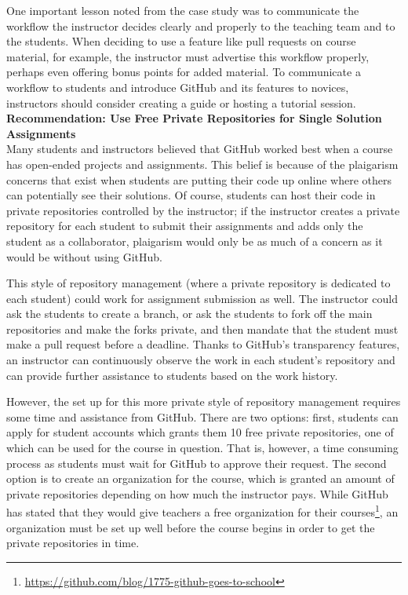 One important lesson noted from the case study was to communicate the workflow the instructor decides clearly and properly to the teaching team and to the students. When deciding to use a feature like pull requests on course material, for example, the instructor must advertise this workflow properly, perhaps even offering bonus points for added material. To communicate a workflow to students and introduce GitHub and its features to novices, instructors should consider creating a guide or hosting a tutorial session. \\


\textbf{Recommendation: Use Free Private Repositories for Single Solution Assignments} \\
Many students and instructors believed that GitHub worked best when a course has open-ended projects and assignments. This belief is because of the plaigarism concerns that exist when students are putting their code up online where others can potentially see their solutions. Of course, students can host their code in private repositories controlled by the instructor; if the instructor creates a private repository for each student to submit their assignments and adds only the student as a collaborator, plaigarism would only be as much of a concern as it would be without using GitHub.

This style of repository management (where a private repository is dedicated to each student) could work for assignment submission as well. The instructor could ask the students to create a branch, or ask the students to fork off the main repositories and make the forks private, and then mandate that the student must make a pull request before a deadline. Thanks to GitHub's transparency features, an instructor can continuously observe the work in each student's repository and can provide further assistance to students based on the work history.

However, the set up for this more private style of repository management requires some time and assistance from GitHub. There are two options: first, students can apply for student accounts which grants them 10 free private repositories, one of which can be used for the course in question. That is, however, a time consuming process as students must wait for GitHub to approve their request. The second option is to create an organization for the course, which is granted an amount of private repositories depending on how much the instructor pays. While GitHub has stated that they would give teachers a free organization for their courses\footnote{\url{https://github.com/blog/1775-github-goes-to-school}}, an organization must be set up well before the course begins in order to get the private repositories in time.

